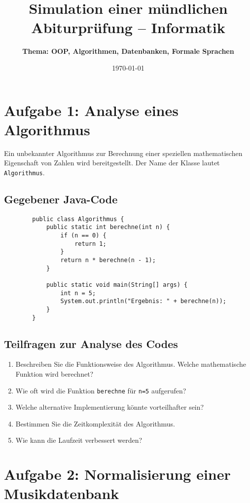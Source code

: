 \documentclass[a4paper,12pt]{article}
\begin{document}
	
	\title{\textbf{Simulation einer mündlichen Abiturprüfung -- Informatik}}
	\author{\textbf{Thema: OOP, Algorithmen, Datenbanken, Formale Sprachen}}
	\date{\today}
	\maketitle
	
	\section*{Aufgabe 1: Analyse eines Algorithmus}
	
	Ein unbekannter Algorithmus zur Berechnung einer speziellen mathematischen Eigenschaft von Zahlen wird bereitgestellt. Der Name der Klasse lautet \texttt{Algorithmus}.
	
	\subsection*{Gegebener Java-Code}
	
	\begin{verbatim}
		public class Algorithmus {
			public static int berechne(int n) {
				if (n == 0) {
					return 1;
				}
				return n * berechne(n - 1);
			}
			
			public static void main(String[] args) {
				int n = 5;
				System.out.println("Ergebnis: " + berechne(n));
			}
		}
	\end{verbatim}
	
	\subsection*{Teilfragen zur Analyse des Codes}
	
	\begin{enumerate}
		\item Beschreiben Sie die Funktionsweise des Algorithmus. Welche mathematische Funktion wird berechnet?
		\item Wie oft wird die Funktion \texttt{berechne} für \texttt{n=5} aufgerufen?
		\item Welche alternative Implementierung könnte vorteilhafter sein?
		\item Bestimmen Sie die Zeitkomplexität des Algorithmus.
		\item Wie kann die Laufzeit verbessert werden?		
	\end{enumerate}
	
	\section*{Aufgabe 2: Normalisierung einer Musikdatenbank}
	
\end{document}
